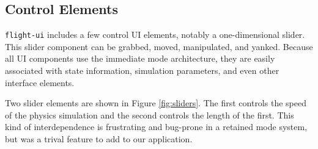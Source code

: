 \documentclass[conference,12pt]{IEEEtran}
\begin{document}
\subsection{Control Elements}

\texttt{flight-ui} includes a few control UI elements, notably a one-dimensional
slider. This slider component can be grabbed, moved, manipulated, and yanked.
Because all UI components use the immediate mode architecture, they are easily
associated with state information, simulation parameters, and even other
interface elements.

Two slider elements are shown in Figure \ref{fig:sliders}. The first controls
the speed of the physics simulation and the second controls the length of the
first. This kind of interdependence is frustrating and bug-prone in a retained
mode system, but was a trival feature to add to our application.
\end{document}
